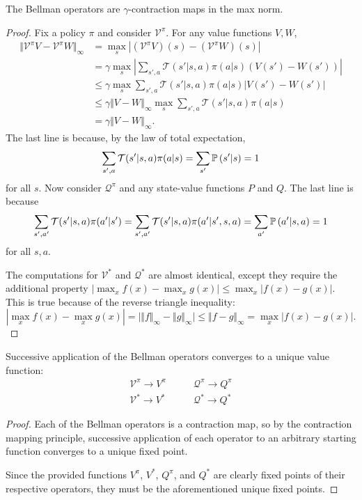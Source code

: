 \documentclass[twoside,10pt]{report}
\begin{document}
\begin{prop}
The Bellman operators are $\gamma$-contraction maps in the max norm.
\end{prop}
\begin{proof}
Fix a policy $\pi$ and consider $\mathcal{V}^{\pi}$. For any value functions $V, W$,
        \begin{align*}
                {\Vert{\mathcal{V}^{\pi} V - \mathcal{V}^{\pi} W}\Vert}_{\infty} &= \max_{s} \left| (\mathcal{V}^{\pi} V)(s) - (\mathcal{V}^{\pi} W)(s) \right| \\                                                       &= \gamma \max_{s} \left| \sum_{s',a} \mathcal{T}(s'|s,a) \pi(a|s) \left( V(s') - W(s') \right) \right| \\                                                       &\leq \gamma \max_{s} \sum_{s',a} \mathcal{T}(s'|s,a) \pi(a|s) \left| V(s') - W(s') \right| \\                                                       &\leq \gamma {\Vert{V-W}\Vert}_{\infty} \max_{s} \sum_{s',a} \mathcal{T}(s'|s,a) \pi(a|s) \\                                                       &= \gamma {\Vert{V-W}\Vert}_{\infty}.
        \end{align*}
        The last line is because, by the law of total expectation,
	\[
		\sum_{s',a} \mathcal{T}(s'|s,a) \pi(a|s) = \sum_{s'} \P{ s' | s } = 1
	\]
	for all $s$. Now consider $\mathcal{Q}^{\pi}$ and any state-value functions $P$ and $Q$.
	The last line is because
	\[
		\sum_{s',a'} \mathcal{T}(s'|s,a) \pi(a'|s') = \sum_{s',a'} \mathcal{T}(s'|s,a)\pi(a'|s',s,a) = \sum_{a'} \P{a'|s,a } = 1
	\]
	for all $s,a$.

	The computations for $\mathcal{V}^{*}$ and $\mathcal{Q}^{*}$ are almost identical, except they require the additional property $\left| \max_{x} f(x) - \max_{x} g(x) \right| \leq \max_x \left| f(x) - g(x) \right|$. This is true because of the reverse triangle inequality:
	\[
	\left| \max_{x}f(x) - \max_{x}g(x) \right| = \Big| {\Vert{f}\Vert}_{\infty} - {\Vert{g}\Vert}_{\infty} \Big| \leq {\Vert{f-g}\Vert}_{\infty} = \max_{x} \left| f(x) - g(x) \right|.
	\]
\end{proof}

\begin{cor}
Successive application of the Bellman operators converges to a unique value function:
\begin{align*}
	\mathcal{V}^{\pi} \to V^{\pi} &\qquad \mathcal{Q}^{\pi} \to Q^{\pi}\\
	\mathcal{V}^{*} \to V^{*} &\qquad \mathcal{Q}^{*} \to Q^{*}
\end{align*}
\end{cor}
\begin{proof}
	Each of the Bellman operators is a contraction map, so by the contraction mapping principle, successive application of each operator to an arbitrary starting function converges to a unique fixed point.

	Since the provided functions $V^{\pi}$, $V^{*}$, $Q^{\pi}$, and $Q^{*}$ are clearly fixed points of their respective operators, they must be the aforementioned unique fixed points.
\end{proof}
\end{document}
